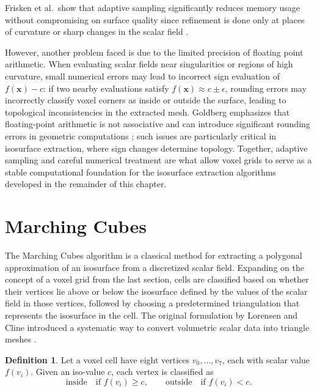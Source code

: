 \documentclass[12pt, a4paper, oneside]{book}
\theoremstyle{plain}
\theoremstyle{definition}
\newtheorem{definition}[theorem]{Definition}
\theoremstyle{remark}
\theoremstyle{definition}
\begin{document}
Frisken et al.\ show that adaptive sampling significantly reduces memory usage without compromising on surface quality since refinement is done only at places of curvature or sharp changes in the scalar field \cite{frisken2000adaptively}.

However, another problem faced is due to the limited precision of floating point arithmetic. When evaluating scalar fields near singularities or regions of high curvature, small numerical errors may lead to incorrect sign evaluation of $f(\mathbf{x}) - c$: if two nearby evaluations satisfy $f(\mathbf{x}) \approx c \pm \epsilon$, rounding errors may incorrectly classify voxel corners as inside or outside the surface, leading to topological inconsistencies in the extracted mesh. Goldberg emphasizes that floating-point arithmetic is not associative and can introduce significant rounding errors in geometric computations \cite{goldberg1991every}; such issues are particularly critical in isosurface extraction, where sign changes determine topology. Together, adaptive sampling and careful numerical treatment are what allow voxel grids to serve as a stable computational foundation for the isosurface extraction algorithms developed in the remainder of this chapter. 

\section{Marching Cubes}

The Marching Cubes algorithm is a classical method for extracting a polygonal approximation of an isosurface from a discretized scalar field. Expanding on the concept of a voxel grid from the last section, cells are classified based on whether their vertices lie above or below the isosurface defined by the values of the scalar field in those vertices, followed by choosing a predetermined triangulation that represents the isosurface in the cell. The original formulation by Lorensen and Cline introduced a systematic way to convert volumetric scalar data into triangle meshes \cite{lorensen1998marching}.

\begin{definition}
Let a voxel cell have eight vertices $v_0, \dots, v_7$, each with scalar value
$f(v_i)$. Given an iso-value $c$, each vertex is classified as
\[
\text{inside} \quad \text{if } f(v_i) \geq c, \qquad \text{outside} \quad \text{if }
f(v_i) < c.
\]
\end{definition}
\end{document}

